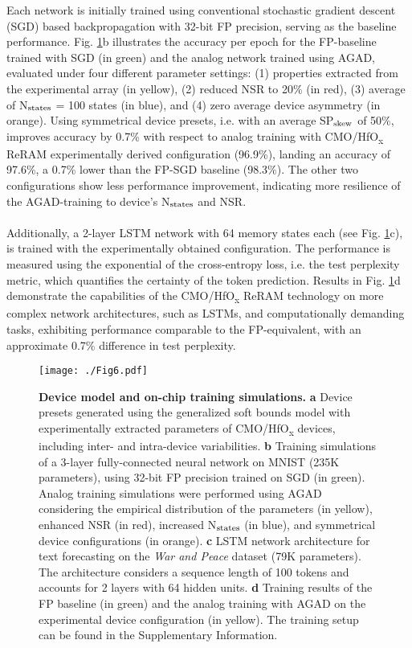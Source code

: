 Each network is initially trained using conventional stochastic gradient descent (SGD) based backpropagation with 32-bit FP precision, serving as the baseline performance. Fig. \ref{fig6}b illustrates the accuracy per epoch for the FP-baseline trained with SGD (in green) and the analog network trained using AGAD, evaluated under four different parameter settings: (1) properties extracted from the experimental array (in yellow), (2) reduced NSR to 20\% (in red), (3) average of N$_{\rm states}$ = 100 states (in blue), and (4) zero average device asymmetry (in orange). Using symmetrical device presets, i.e. with an average SP$_{\rm skew}$ of 50\%, improves accuracy by 0.7\% with respect to analog training with CMO/HfO\textsubscript{\textnormal{x}} ReRAM experimentally derived configuration (96.9\%), landing an accuracy of 97.6\%, a 0.7\% lower than the FP-SGD baseline (98.3\%). The other two configurations show less performance improvement, indicating more resilience of the AGAD-training to device's N$_{\rm states}$ and NSR.
\\
\\
Additionally, a 2-layer LSTM network with 64 memory states each (see Fig. \ref{fig6}c), is trained with the experimentally obtained configuration. The performance is measured using the exponential of the cross-entropy loss, i.e. the test perplexity metric, which quantifies the certainty of the token prediction. Results in Fig. \ref{fig6}d demonstrate the capabilities of the CMO/HfO\textsubscript{\textnormal{x}} ReRAM technology on more complex network architectures, such as LSTMs, and computationally demanding tasks, exhibiting performance comparable to the FP-equivalent, with an approximate 0.7\% difference in test perplexity.
\begin{figure}[H]
\centering
\texttt{[image: ./Fig6.pdf]} 
\caption{\textbf{Device model and on-chip training simulations.} \textbf{a} Device presets generated using the generalized soft bounds model with experimentally extracted parameters of CMO/HfO\textsubscript{\textnormal{x}}  devices, including inter- and intra-device variabilities. \textbf{b} Training simulations of a 3-layer fully-connected neural network on MNIST (235K parameters), using 32-bit FP precision trained on SGD (in green). Analog training simulations were performed using AGAD considering the empirical distribution of the parameters (in yellow), enhanced NSR (in red), increased N$_{\rm states}$ (in blue), and symmetrical device configurations (in orange). \textbf{c} LSTM network architecture for text forecasting on the \textit{War and Peace} dataset (79K parameters). The architecture  considers a sequence length of 100 tokens and accounts for 2 layers with 64 hidden units. \textbf{d} Training results of the FP baseline (in green) and the analog training with AGAD on the experimental device configuration (in yellow). The training setup can be found in the Supplementary Information.}
\label{fig6}
\end{figure}

